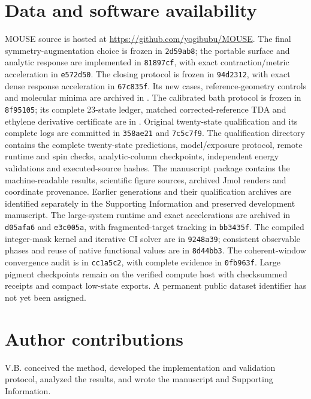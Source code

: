 \documentclass[11pt,a4paper]{article}
\begin{document}
\section*{Data and software availability}
MOUSE source is hosted at \url{https://github.com/yogibubu/MOUSE}.
The final symmetry-augmentation choice is frozen in \texttt{2d59ab8}; the
portable surface and analytic response are implemented in \texttt{81897cf},
with exact contraction/metric acceleration in \texttt{e572d50}.
The closing protocol is frozen in \texttt{94d2312}, with exact dense
response acceleration in \texttt{67c835f}. Its new cases, reference-geometry
controls and molecular minima are archived in
.
The calibrated bath protocol is frozen in \texttt{8f95105}; its complete
23-state ledger, matched corrected-reference TDA and ethylene derivative
certificate are in .
Original twenty-state qualification and its complete logs are committed in \texttt{358ae21}
and \texttt{7c5c7f9}. The qualification directory
contains the complete twenty-state predictions, model/exposure protocol,
remote runtime and spin checks, analytic-column checkpoints, independent
energy validations and executed-source hashes. The manuscript package
contains the machine-readable results, scientific figure sources, archived
Jmol renders and coordinate provenance. Earlier generations and their
qualification archives are identified separately in the Supporting Information
and preserved development manuscript. The large-system runtime and exact accelerations are archived in
\texttt{d05afa6} and \texttt{e3c005a}, with fragmented-target tracking
in \texttt{bb3435f}. The compiled integer-mask kernel and iterative CI
solver are in \texttt{9248a39}; consistent observable phases and reuse of
native functional values are in \texttt{8d44bb3}. The coherent-window
convergence audit is in \texttt{cc1a5c2}, with complete evidence in
\texttt{0fb963f}. Large pigment checkpoints remain on the verified
compute host with checksummed receipts and compact low-state exports.
A permanent public dataset identifier
has not yet been assigned.

\section*{Author contributions}
V.B. conceived the method, developed the implementation and validation
protocol, analyzed the results, and wrote the manuscript and Supporting
Information.
\end{document}
